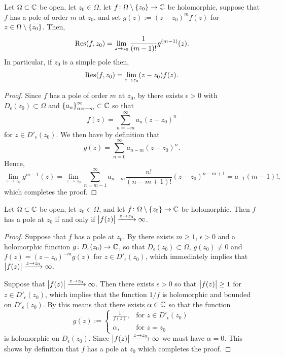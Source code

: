\documentclass[11pt,a4paper]{article}
\begin{document}
\begin{lemma}
  Let $\Omega \subset \mathbb{C}$ be open,
  let $z_0 \in \Omega$,
  let $f \colon \Omega \setminus \left\{z_0\right\} \to \mathbb{C}$ be holomorphic,
  suppose that $f$ has a pole of order $m$ at $z_0$,
  and set $g(z) := (z - z_0)^{m} f(z)$ for $z \in \Omega \setminus \left\{z_0\right\}$.
  Then,
  \[
    \operatorname{Res}(f,z_0) = \lim_{z \to z_0} \frac{1}{(m-1)!} g^{(m-1)}(z).
  \]
  In particular, if $z_0$ is a simple pole then,
  \[
    \operatorname{Res}(f,z_0) = \lim_{z \to z_0} (z - z_0) f(z).
  \]
\end{lemma}
\begin{proof}
  Since $f$ has a pole of order $m$ at $z_0$,
  by 
  there exists $\epsilon > 0$ with $D_{\epsilon}(z_0) \subset \Omega$
  and $\left\{a_n \right\}_{n=-m}^{\infty} \subset \mathbb{C}$ so that
  \[
    f(z) = \sum_{n=-m}^{\infty} a_n (z - z_0)^n
  \]
  for $z \in D'_{\epsilon}(z_0)$.
  We then have by definition that
  \[
    g(z) = \sum_{n=0}^{\infty} a_{n-m} (z - z_0)^n.
  \]
  Hence,
  \[
    \lim_{z \to z_0} g^{m-1}(z) =
    \lim_{z \to z_0} \sum_{n=m-1}^{\infty}
      a_{n - m} \frac{n!}{(n - m + 1)!} (z - z_0)^{n - m + 1} =
      a_{-1} (m - 1)!,
  \]
  which completes the proof.
\end{proof}

\begin{proposition}
  \label{prp:pole-iff-infty}
  Let $\Omega \subset \mathbb{C}$ be open,
  let $z_0 \in \Omega$,
  and let $f \colon \Omega \setminus \left\{z_0\right\} \to \mathbb{C}$ be holomorphic.
  Then $f$ has a pole at $z_0$ if and only if
  $\left\lvert f(z)\right\rvert \xrightarrow{z \to z_0} \infty$.
\end{proposition}
\begin{proof}
  Suppose that $f$ has a pole at $z_0$.
  By  there exists $m \geq 1$, $\epsilon > 0$
  and a holomorphic function $g \colon D_{\epsilon}(z_0) \to \mathbb{C}$,
  so that $D_{\epsilon}(z_0) \subset \Omega$, $g(z_0) \neq 0$ and
  $f(z) = (z - z_0)^{-m} g(z)$ for $z \in D'_{\epsilon}(z_0)$,
  which immediately implies that
  $\left\lvert f(z)\right\rvert \xrightarrow{z \to z_0} \infty$.

  Suppose that $\left\lvert f(z)\right\rvert \xrightarrow{z \to z_0} \infty$.
  Then there exists $\epsilon > 0$ so that $\left\lvert f(z)\right\rvert \geq 1$ for
  $z \in D'_{\epsilon}(z_0)$, which implies that the function $1/f$ is
  holomorphic and bounded on $D'_{\epsilon}(z_0)$.
  By  this means that
  there exists $\alpha \in \mathbb{C}$ so that the function
  \[
    g(z) :=
    \begin{cases}
      \frac{1}{f(z)}, &\text{for } z \in D'_{\epsilon}(z_0) \\
      \alpha, &\text{for } z = z_0
    \end{cases}
  \]
  is holomorphic on $D_{\epsilon}(z_0)$.
  Since $\left\lvert f(z)\right\rvert \xrightarrow{z \to z_0} \infty$ we must have $\alpha = 0$.
  This shows by definition that $f$ has a pole at $z_0$ which completes the
  proof.
\end{proof}
\end{document}
